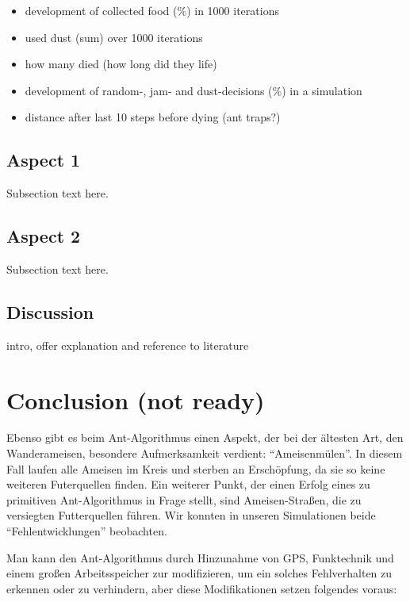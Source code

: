 \begin{itemize}
\tightlist
\item
  development of collected food (\%) in 1000 iterations
\item
  used dust (sum) over 1000 iterations
\item
  how many died (how long did they life)
\item
  development of random-, jam- and dust-decisions (\%) in a simulation
\item
  distance after last 10 steps before dying (ant traps?)
\end{itemize}

\subsection{Aspect 1}\label{aspect-1}

Subsection text here.

\subsection{Aspect 2}\label{aspect-2}

Subsection text here.

\subsection{Discussion}\label{discussion}

intro, offer explanation and reference to literature

\section{Conclusion (not ready)}\label{conclusion-not-ready}

Ebenso gibt es beim Ant-Algorithmus einen Aspekt, der bei der ältesten
Art, den Wanderameisen, besondere Aufmerksamkeit verdient:
``Ameisenmülen''. In diesem Fall laufen alle Ameisen im Kreis und
sterben an Erschöpfung, da sie so keine weiteren Futerquellen finden.
Ein weiterer Punkt, der einen Erfolg eines zu primitiven Ant-Algorithmus
in Frage stellt, sind Ameisen-Straßen, die zu versiegten Futterquellen
führen. Wir konnten in unseren Simulationen beide ``Fehlentwicklungen''
beobachten.

Man kann den Ant-Algorithmus durch Hinzunahme von GPS, Funktechnik und
einem großen Arbeitsspeicher zur modifizieren, um ein solches
Fehlverhalten zu erkennen oder zu verhindern, aber diese Modifikationen
setzen folgendes voraus:

